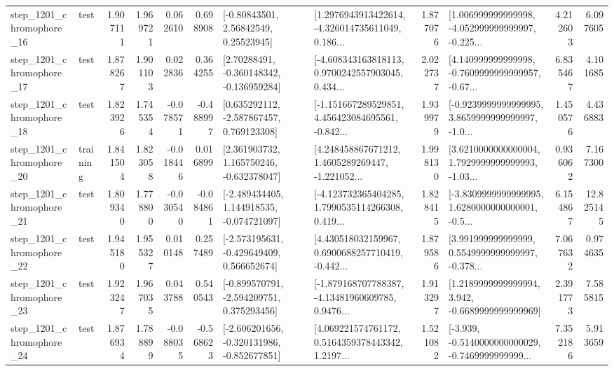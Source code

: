 \begin{tabular}{llrrrrllrlrr}
 step\_1201\_chromophore\_16 &      test &      1.907111 &    1.969721 &      0.062610 &  0.698908 &       [-0.80843501, 2.56842549, 0.25523945] &  [1.2976943913422614, -4.326014735611049, 0.186... &       1.877076 &  [1.006999999999998, -4.052999999999997, -0.225... &            4.212603 &          6.097605 \\
 step\_1201\_chromophore\_17 &      test &      1.878267 &    1.901103 &      0.022836 &  0.364255 &    [2.70288491, -0.360148342, -0.136959284] &  [-4.608343163818113, 0.9700242557903045, 0.434... &       2.022737 &  [4.140999999999998, -0.7609999999999957, -0.67... &            6.835467 &          4.101685 \\
 step\_1201\_chromophore\_18 &      test &      1.823926 &    1.745354 &     -0.078571 & -0.488997 &    [0.635292112, -2.587867457, 0.769123308] &  [-1.151667289529851, 4.456423084695561, -0.842... &       1.939979 &  [-0.9239999999999995, 3.8659999999999997, -1.0... &            1.450576 &          4.436883 \\
 step\_1201\_chromophore\_20 &  training &      1.841504 &    1.823058 &     -0.018446 &  0.016899 &    [2.361903732, 1.165750246, -0.632378047] &  [4.248458867671212, 1.4605289269447, -1.221052... &       1.998130 &  [3.6210000000000004, 1.7929999999999993, -1.03... &            0.936062 &          7.167300 \\
 step\_1201\_chromophore\_21 &      test &      1.809340 &    1.778800 &     -0.030540 & -0.084861 &   [-2.489434405, 1.144918535, -0.074721097] &  [-4.123732365404285, 1.7990535114266308, 0.419... &       1.828415 &  [-3.8309999999999995, 1.6280000000000001, -0.5... &            6.154867 &         12.825145 \\
 step\_1201\_chromophore\_22 &      test &      1.945180 &    1.955327 &      0.010148 &  0.257489 &   [-2.573195631, -0.429649409, 0.566652674] &  [4.430518032159967, 0.6900688257710419, -0.442... &       1.879586 &  [3.991999999999999, 0.5549999999999997, -0.378... &            7.067632 &          0.974635 \\
 step\_1201\_chromophore\_23 &      test &      1.923247 &    1.967035 &      0.043788 &  0.540543 &   [-0.899570791, -2.594209751, 0.375293456] &  [-1.879168707788387, -4.13481960609785, 0.9476... &       1.913297 &   [1.2189999999999994, 3.942, -0.6689999999999969] &            2.391773 &          7.585815 \\
 step\_1201\_chromophore\_24 &      test &      1.876934 &    1.788899 &     -0.088035 & -0.568623 &  [-2.606201656, -0.320131986, -0.852677851] &  [4.069221574761172, 0.5164359378443342, 1.2197... &       1.521082 &  [-3.939, -0.5140000000000029, -0.7469999999999... &            7.352186 &          5.913659 \\

\end{tabular}
